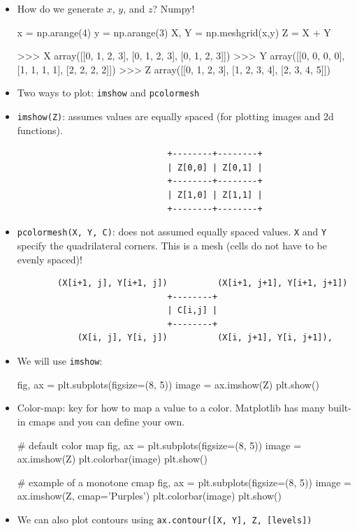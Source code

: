 \documentclass[12pt]{article}
\numberwithin{equation}{section}
\begin{document}
\begin{itemize}
    \item How do we generate $x$, $y$, and $z$? Numpy!
    \begin{python}
    x = np.arange(4)
    y = np.arange(3)
    X, Y = np.meshgrid(x,y)
    Z = X + Y
    
    >>> X
    array([[0, 1, 2, 3],
           [0, 1, 2, 3],
           [0, 1, 2, 3]])
    >>> Y
    array([[0, 0, 0, 0],
           [1, 1, 1, 1],
           [2, 2, 2, 2]])
    >>> Z
    array([[0, 1, 2, 3],
           [1, 2, 3, 4],
           [2, 3, 4, 5]])
    \end{python}
    \item Two ways to plot: \verb|imshow| and \verb|pcolormesh|
    \item \verb|imshow(Z)|: assumes values are equally spaced (for plotting images and 2d functions).
    \begin{verbatim}
                              +--------+--------+
                              | Z[0,0] | Z[0,1] |
                              +--------+--------+
                              | Z[1,0] | Z[1,1] |
                              +--------+--------+
    \end{verbatim}
    \item \verb|pcolormesh(X, Y, C)|: does not assumed equally spaced values. \verb|X| and \verb|Y| specify the quadrilateral corners. This is a mesh (cells do not have to be evenly spaced)!
    \begin{verbatim}
        (X[i+1, j], Y[i+1, j])          (X[i+1, j+1], Y[i+1, j+1])
                              +--------+
                              | C[i,j] |
                              +--------+
            (X[i, j], Y[i, j])          (X[i, j+1], Y[i, j+1]),
    \end{verbatim}
    \item We will use \verb|imshow|:
    \begin{python}
    fig, ax = plt.subplots(figsize=(8, 5))
    image = ax.imshow(Z)
    plt.show()
    \end{python}
    \item Color-map: key for how to map a value to a color. Matplotlib has many built-in cmaps and you can define your own.
    \begin{python}
    # default color map
    fig, ax = plt.subplots(figsize=(8, 5))
    image = ax.imshow(Z)
    plt.colorbar(image)
    plt.show()
    
    # example of a monotone cmap
    fig, ax = plt.subplots(figsize=(8, 5))
    image = ax.imshow(Z, cmap='Purples')
    plt.colorbar(image)
    plt.show()
    \end{python}
    \item We can also plot contours using \verb|ax.contour([X, Y], Z, [levels])|
\end{itemize}
\end{document}
